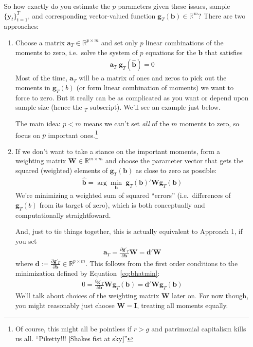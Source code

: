 \documentclass[12pt]{article}
\theoremstyle{plain}
\theoremstyle{definition}
\theoremstyle{remark}
\newcommand{\bsb}{\boldsymbol{b}}
\newcommand{\bshatb}{\boldsymbol{\hat{b}}}
\newcommand{\bsd}{\boldsymbol{d}}
\newcommand{\bsg}{\boldsymbol{g}}
\newcommand{\bsy}{\boldsymbol{y}}
\begin{document}
So how exactly do you estimate the $p$ parameters given these issues,
sample $\{\bsy_t\}_{t=1}^T$, and corresponding vector-valued
function $\bsg_T(\bsb)\in \mathbb{R}^m$? There are
two approaches:
\begin{enumerate}
  \item Choose a matrix $\boldsymbol{a}_T\in\mathbb{R}^{p\times m}$ and
    set only $p$ linear combinations of the
    moments to zero, i.e.\ solve the system of $p$ equations for the
    $\bshatb$ that satisfies
    \begin{align}
      \boldsymbol{a}_T
      \;
      \bsg_T(\bshatb) = 0
      \label{eq:bhatdef}
    \end{align}
    Most of the time, $\boldsymbol{a}_T$ will be a matrix of ones and
    zeros to pick out the moments in $\bsg_T(b)$ (or form
    linear combination of moments) we want to force to zero. But it
    really can be as complicated as you want or depend upon sample size
    (hence the ${}_T$ subscript). We'll see an example just below.

    The main idea: $p<m$ means we can't set \emph{all} of the $m$
    moments to zero, so focus on $p$ important ones.\footnote{Of course,
      this might all be pointless if $r > g$ and patrimonial capitalism
    kills us all. ``Piketty!!! [Shakes fist at sky]''}

  \item If we don't want to take a stance on the important moments, form
    a weighting matrix $\boldsymbol{W}\in \mathbb{R}^{m\times m}$ and
    choose the parameter vector that gets the squared (weighted)
    elements of $\bsg_T(\bsb)$ as close to zero as
    possible:
    \begin{align}
      \bshatb = \arg\min_{\bsb}\;
      \bsg_T(\bsb)' \boldsymbol{W}
      \bsg_T(\bsb)
      \label{eq:bhatmin}
    \end{align}
    We're minimizing a weighted sum of squared ``errors'' (i.e.\
    differences of $\bsg_T(b)$ from its target of zero), which
    is both conceptually and computationally straightfoward.

    And, just to tie things together, this is actually equivalent to
    Approach 1, if you set
    \begin{align}
      \boldsymbol{a}_T =
      \frac{\partial \bsg'_T}{\partial \bsb}
      \boldsymbol{W}
      =
      \bsd'
      \boldsymbol{W}
      \label{eq:equivrep}
    \end{align}
    where $\bsd
    :=\frac{\partial \bsg'_T}{\partial \bsb}
    \in \mathbb{R}^{p\times m}$.
    This follows from the first order conditions to the minimization
    defined by Equation~\ref{eq:bhatmin}:
    \begin{align*}
      0
      = \frac{\partial \bsg'_T}{\partial \bsb}
      \boldsymbol{W} \bsg_T(\bsb)
      = \bsd'
      \boldsymbol{W} \bsg_T(\bsb)
    \end{align*}
    We'll talk about choices of the weighting matrix
    $\boldsymbol{W}$ later on. For now though, you might reasonably just
    choose $\boldsymbol{W}=\boldsymbol{I}$, treating all moments
    equally.
\end{enumerate}
\end{document}
